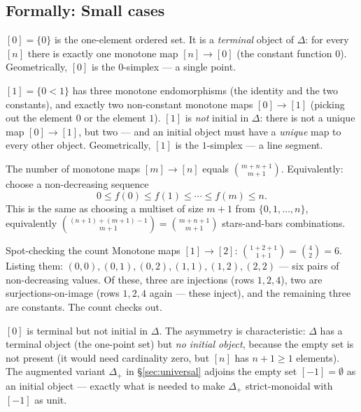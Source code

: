 \subsection{Formally: Small cases}

\begin{example_thm}
$[0] = \{0\}$ is the one-element ordered set. It is a \emph{terminal}
object of $\Delta$: for every $[n]$ there is exactly one monotone map
$[n] \to [0]$ (the constant function $0$). Geometrically, $[0]$ is the
$0$-simplex — a single point.

$[1] = \{0 < 1\}$ has three monotone endomorphisms (the identity and the
two constants), and exactly two non-constant monotone maps $[0] \to [1]$
(picking out the element $0$ or the element $1$). $[1]$ is \emph{not}
initial in $\Delta$: there is not a unique map $[0] \to [1]$, but two —
and an initial object must have a \emph{unique} map to every other
object. Geometrically, $[1]$ is the $1$-simplex — a line segment.
\end{example_thm}

\begin{example_thm}
\label{ex:counting-monotone}
The number of monotone maps $[m] \to [n]$ equals $\binom{m + n + 1}{m + 1}$.
Equivalently: choose a non-decreasing sequence
\begin{equation*}
  0 \leq f(0) \leq f(1) \leq \cdots \leq f(m) \leq n.
\end{equation*}
This is the same as choosing a multiset of size $m+1$ from $\{0, 1, \ldots,
n\}$, equivalently $\binom{(n+1) + (m+1) - 1}{m+1} = \binom{m+n+1}{m+1}$
stars-and-bars combinations.
\end{example_thm}

\begin{example}{Spot-checking the count}
Monotone maps $[1] \to [2]$: $\binom{1 + 2 + 1}{1 + 1} = \binom{4}{2} = 6$.
Listing them: $(0,0), (0,1), (0,2), (1,1), (1,2), (2,2)$ — six pairs of
non-decreasing values. Of these, three are injections (rows $1, 2, 4$),
two are surjections-on-image (rows $1, 2, 4$ again — these inject), and
the remaining three are constants. The count checks out.
\end{example}

\begin{readernote}
$[0]$ is terminal but not initial in $\Delta$. The asymmetry is
characteristic: $\Delta$ has a terminal object (the one-point set) but
\emph{no initial object}, because the empty set is not present (it would
need cardinality zero, but $[n]$ has $n+1 \geq 1$ elements). The
augmented variant $\Delta_+$ in \S\ref{sec:universal} adjoins the empty
set $[-1] = \emptyset$ as an initial object — exactly what is needed to
make $\Delta_+$ strict-monoidal with $[-1]$ as unit.
\end{readernote}

